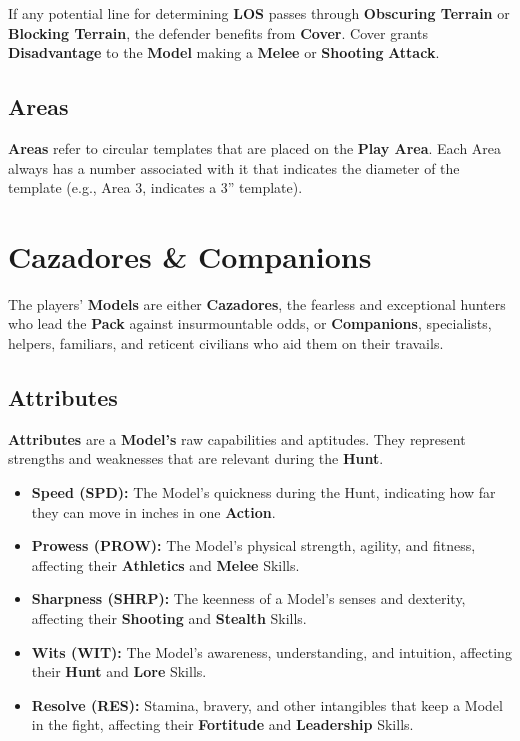\documentclass[
]{book}
\providecommand{\tightlist}{%
  \setlength{\itemsep}{0pt}\setlength{\parskip}{0pt}}
\begin{document}
If any potential line for determining \textbf{LOS} passes through \textbf{Obscuring Terrain} or \textbf{Blocking Terrain}, the defender benefits from \textbf{Cover}. Cover grants \textbf{Disadvantage} to the \textbf{Model} making a \textbf{Melee} or \textbf{Shooting} \textbf{Attack}.

\hypertarget{areas}{%
\subsection*{Areas}\label{areas}}

\textbf{Areas} refer to circular templates that are placed on the \textbf{Play Area}. Each Area always has a number associated with it that indicates the diameter of the template (e.g., Area 3, indicates a 3'' template).

\hypertarget{cazadores}{%
\section{Cazadores \& Companions}\label{cazadores}}

The players' \textbf{Models} are either \textbf{Cazadores}, the fearless and exceptional hunters who lead the \textbf{Pack} against insurmountable odds, or \textbf{Companions}, specialists, helpers, familiars, and reticent civilians who aid them on their travails.

\hypertarget{attributes}{%
\subsection*{Attributes}\label{attributes}}

\textbf{Attributes} are a \textbf{Model's} raw capabilities and aptitudes. They represent strengths and weaknesses that are relevant during the \textbf{Hunt}.

\begin{itemize}
\tightlist
\item
  \textbf{Speed (SPD):} The Model's quickness during the Hunt, indicating how far they can move in inches in one \textbf{Action}.
\item
  \textbf{Prowess (PROW):} The Model's physical strength, agility, and fitness, affecting their \textbf{Athletics} and \textbf{Melee} Skills.
\item
  \textbf{Sharpness (SHRP):} The keenness of a Model's senses and dexterity, affecting their \textbf{Shooting} and \textbf{Stealth} Skills.
\item
  \textbf{Wits (WIT):} The Model's awareness, understanding, and intuition, affecting their \textbf{Hunt} and \textbf{Lore} Skills.
\item
  \textbf{Resolve (RES):} Stamina, bravery, and other intangibles that keep a Model in the fight, affecting their \textbf{Fortitude} and \textbf{Leadership} Skills.
\end{itemize}
\end{document}
